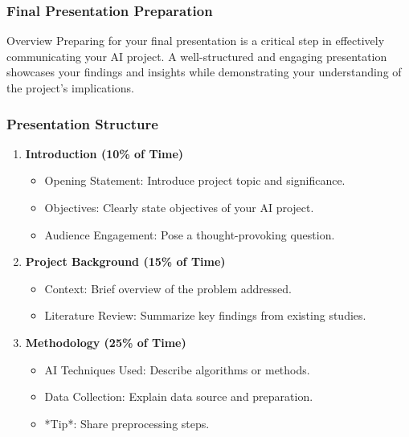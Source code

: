 \documentclass[aspectratio=169]{beamer}
\begin{document}
\begin{frame}
  \frametitle{Final Presentation Preparation}
  \begin{block}{Overview}
    Preparing for your final presentation is a critical step in effectively communicating your AI project. A well-structured and engaging presentation showcases your findings and insights while demonstrating your understanding of the project's implications.
  \end{block}
\end{frame}

\begin{frame}
  \frametitle{Presentation Structure}
  \begin{enumerate}
    \item \textbf{Introduction (10\% of Time)}
      \begin{itemize}
        \item Opening Statement: Introduce project topic and significance.
        \item Objectives: Clearly state objectives of your AI project.
        \item Audience Engagement: Pose a thought-provoking question.
      \end{itemize}

    \item \textbf{Project Background (15\% of Time)}
      \begin{itemize}
        \item Context: Brief overview of the problem addressed.
        \item Literature Review: Summarize key findings from existing studies.
      \end{itemize}
      
    \item \textbf{Methodology (25\% of Time)}
      \begin{itemize}
        \item AI Techniques Used: Describe algorithms or methods.
        \item Data Collection: Explain data source and preparation.
        \item *Tip*: Share preprocessing steps.
      \end{itemize}
  \end{enumerate}
\end{frame}
\end{document}

